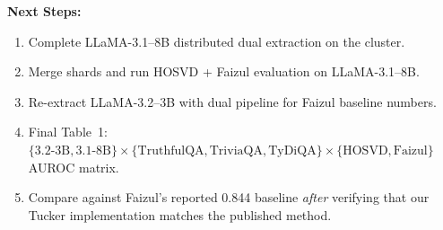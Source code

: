 \documentclass[11pt,a4paper]{article}
\begin{document}
\noindent
\textbf{Next Steps:}
\begin{enumerate}
  \item Complete LLaMA-3.1--8B distributed dual extraction on the cluster.
  \item Merge shards and run HOSVD + Faizul evaluation on LLaMA-3.1--8B.
  \item Re-extract LLaMA-3.2--3B with dual pipeline for Faizul baseline
        numbers.
  \item Final Table~1: $\{3.2\text{-3B}, 3.1\text{-8B}\} \times
        \{\text{TruthfulQA}, \text{TriviaQA}, \text{TyDiQA}\} \times
        \{\text{HOSVD}, \text{Faizul}\}$ AUROC matrix.
    \item Compare against Faizul's reported 0.844 baseline \emph{after} verifying
          that our Tucker implementation matches the published method.
\end{enumerate}
\end{document}
